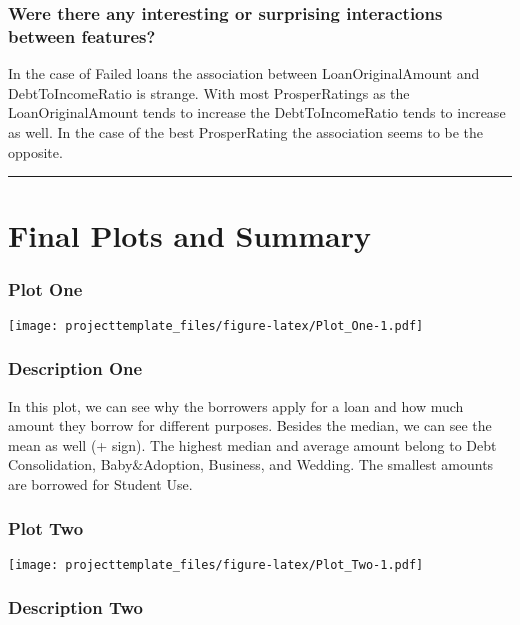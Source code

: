 \documentclass[]{article}
\begin{document}
\subsubsection{Were there any interesting or surprising interactions
between
features?}\label{were-there-any-interesting-or-surprising-interactions-between-features}

In the case of Failed loans the association between LoanOriginalAmount
and DebtToIncomeRatio is strange. With most ProsperRatings as the
LoanOriginalAmount tends to increase the DebtToIncomeRatio tends to
increase as well. In the case of the best ProsperRating the association
seems to be the opposite.

\begin{center}\rule{0.5\linewidth}{\linethickness}\end{center}

\section{Final Plots and Summary}\label{final-plots-and-summary}

\subsubsection{Plot One}\label{plot-one}

\texttt{[image: projecttemplate\_files/figure-latex/Plot\_One-1.pdf]}

\subsubsection{Description One}\label{description-one}

In this plot, we can see why the borrowers apply for a loan and how much
amount they borrow for different purposes. Besides the median, we can
see the mean as well (+ sign). The highest median and average amount
belong to Debt Consolidation, Baby\&Adoption, Business, and Wedding. The
smallest amounts are borrowed for Student Use.

\subsubsection{Plot Two}\label{plot-two}

\texttt{[image: projecttemplate\_files/figure-latex/Plot\_Two-1.pdf]}

\subsubsection{Description Two}\label{description-two}
\end{document}
